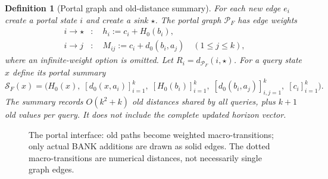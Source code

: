 \documentclass[11pt,letterpaper]{article}
\newtheorem{definition}[theorem]{Definition}
\newcommand{\PP}{\mathcal P}
\begin{document}
\begin{definition}[Portal graph and old-distance summary]\label{def:portal}
For each new edge $e_i$ create a portal state $i$ and create a sink $\star$. The \emph{portal graph} $\PP_F$ has edge weights
\begin{align}
 i\longrightarrow \star &: \quad h_i:=c_i+H_0(b_i),\label{eq:h}\tag{P1}\\
 i\longrightarrow j &: \quad M_{ij}:=c_i+d_0(b_i,a_j)\quad(1\le j\le k),\label{eq:M}\tag{P2}
\end{align}
where an infinite-weight option is omitted. Let $R_i=d_{\PP_F}(i,\star)$. For a query state $x$ define its \emph{portal summary}
\[
\mathcal S_F(x)=\bigl(H_0(x),\;[d_0(x,a_i)]_{i=1}^{k},\;[H_0(b_i)]_{i=1}^{k},\;[d_0(b_i,a_j)]_{i,j=1}^{k},\;[c_i]_{i=1}^{k}\bigr).
\]
The summary records $O(k^2+k)$ old distances shared by all queries, plus $k+1$ old values per query. It does not include the complete updated horizon vector.
\end{definition}
\begin{figure}[ht]
\centering
{}
\caption{The portal interface: old paths become weighted macro-transitions; only actual BANK additions are drawn as solid edges. The dotted macro-transitions are numerical distances, not necessarily single graph edges.}
\label{fig:portal}
\end{figure}
\end{document}
